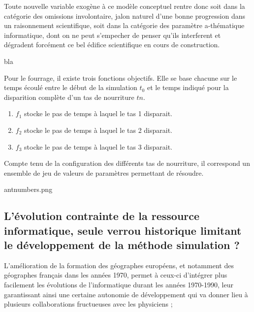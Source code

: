 Toute nouvelle variable exogène à ce modèle conceptuel rentre donc soit dans la catégorie des omissions involontaire, jalon naturel d'une bonne progression dans un raisonnement scientifique, soit dans la catégorie des paramètre a-thématique informatique, dont on ne peut s'empecher de penser qu'ils interferent et dégradent forcément ce bel édifice scientifique en cours de construction.



\begin{framewithtitle}[bla]{bla}

Pour le fourrage, il existe trois fonctions objectifs. Elle se base chacune sur le temps écoulé entre le début de la simulation $t_0$ et le temps indiqué pour la disparition complète d'un tas de nourriture $tn$.

\begin{enumerate}
\item $f_1$ stocke le pas de temps à laquel le tas 1 disparait.
\item $f_2$ stocke le pas de temps à laquel le tas 2 disparait.
\item $f_3$ stocke le pas de temps à laquel le tas 3 disparait.
\end{enumerate}

Compte tenu de la configuration des différents tas de nourriture, il correspond un ensemble de jeu de valeurs de paramètres permettant de résoudre.

antnumbers.png

\end{framewithtitle}


\subsection{L'évolution contrainte de la ressource informatique, seule verrou historique limitant le développement de la méthode simulation ?}
\label{sec:verrou_informatique}

L'amélioration de la formation des géographes européens, et notamment des géographes français dans les années 1970, permet à ceux-ci d'intégrer plus facilement les évolutions de l'informatique durant les années 1970-1990, leur garantissant ainsi une certaine autonomie de développement qui va donner lieu à plusieurs collaborations fructueuses avec les physiciens \autocite{Pumain1984}; 

